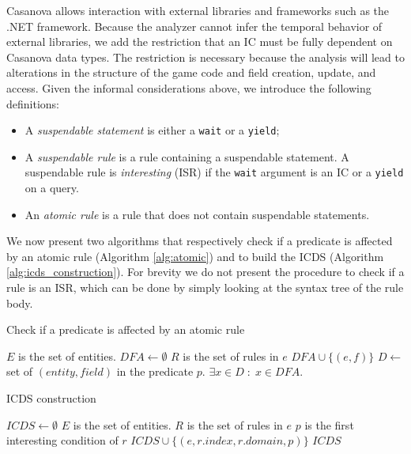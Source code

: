 Casanova allows interaction with external libraries and frameworks such as the .NET framework. Because the analyzer cannot infer the temporal behavior of external libraries, we add the restriction that an IC must be fully dependent on Casanova data types. The restriction is necessary because the analysis will lead to alterations in the structure of the game code and field creation, update, and access. Given the informal considerations above, we introduce the following definitions:
\begin{itemize}
\item A \textit{suspendable statement} is either a \texttt{wait} or a \texttt{yield};
\item A \textit{suspendable rule} is a rule containing a suspendable statement. A suspendable rule is \textit{interesting} (ISR) if the \texttt{wait} argument is an IC or a \texttt{yield} on a query.
\item An \textit{atomic rule} is a rule that does not contain suspendable statements.
\end{itemize}

We now present two algorithms that respectively check if a predicate is affected by an atomic rule (Algorithm \ref{alg:atomic}) and to build the ICDS (Algorithm \ref{alg:icds_construction}). For brevity we do not present the procedure to check if a rule is an ISR, which can be done by simply looking at the syntax tree of the rule body.


\begin{algorithm}
	
\caption{Check if a predicate is affected by an atomic rule}

\label{alg:atomic}
\begin{algorithmic}
    \State $E$ is the set of entities.
    \State $DFA \gets \emptyset$
        \State $R$ is the set of rules in $e$
                    \State $DFA \cup \lbrace (e,f) \rbrace$
                \EndFor
            \EndIf
        \EndFor
    \EndFor
    \State $D \gets$ set of $(entity,field)$ in the predicate $p$.
    \State \Return $\exists x \in D \; : \; x \in DFA$.
\EndFunction
\end{algorithmic}
\end{algorithm}

\begin{algorithm}
\caption{ICDS construction}

\label{alg:icds_construction}
\begin{algorithmic}
    \State $ICDS \gets \emptyset$
    \State $E$ is the set of entities.
        \State $R$ is the set of rules in $e$
                \State $p$ is the first interesting condition of $r$
                    \State $ICDS \cup \lbrace (e,r.index,r.domain,p) \rbrace$
                \EndIf
            \EndIf
        \EndFor
    \EndFor
    \State \Return $ICDS$
\EndFunction
\end{algorithmic}
\end{algorithm}


